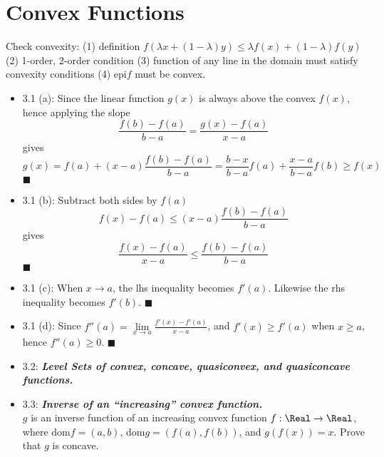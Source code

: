 \section{Convex Functions} Check convexity: (1) definition $f(\lambda x+ (1-\lambda)y) \le \lambda
f(x) + (1-\lambda) f(y)$ (2) 1-order, 2-order condition (3) function of any line in the domain must
satisfy convexity conditions (4) epi$f$ must be convex.  \begin{itemize}

\subsection{Definition of Convexity} \item 3.1 (a): Since the linear function $g(x)$ is always above
the convex $f(x)$, hence applying the slope \begin{equation*} \frac{f(b)-f(a)}{b-a}=
\frac{g(x)-f(a)}{x-a} \end{equation*} gives \begin{equation*} g(x)=f(a)+(x-a)\frac{f(b)-f(a)}{b-a}=
\frac{b-x}{b-a}f(a) + \frac{x-a}{b-a}f(b) \ge f(x) \end{equation*} $\blacksquare$ \item 3.1 (b):
Subtract both sides by $f(a)$ \begin{equation*} f(x)-f(a) \le (x-a) \frac{f(b)-f(a)}{b-a}
\end{equation*} gives \begin{equation*} \frac{f(x)-f(a)}{x-a} \le \frac{f(b)-f(a)}{b-a}
\end{equation*} $\blacksquare$ \item 3.1 (c): When $x \rightarrow a$, the lhs inequality becomes
$f'(a)$. Likewise the rhs inequality becomes $f'(b)$.  $\blacksquare$ \item 3.1 (d): Since $f''(a) =
\lim\limits_{x \rightarrow a} \frac{f'(x)-f'(a)}{x-a}$, and $f'(x) \ge f'(a)$ when $x \ge a$, hence
$f''(a) \ge 0$.  $\blacksquare$
   
\item 3.2: {\bf\emph{Level Sets of convex, concave, quasiconvex, and quasiconcave functions.}}

\item 3.3: {\bf\emph{Inverse of an ``increasing'' convex function.}} \\ $g$ is an inverse function of
an increasing convex function $f: \Real \rightarrow \Real$, where dom$f = (a,b)$, dom$g= (f(a),f(b))$,
and $g(f(x))=x$.  Prove that $g$ is concave. \\


\end{itemize}
